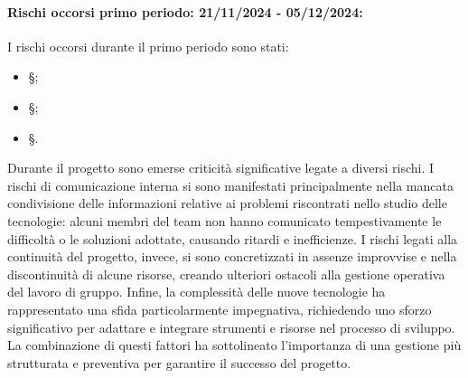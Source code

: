 \paragraph{Rischi occorsi primo periodo: 21/11/2024 - 05/12/2024: }
I rischi occorsi durante il primo periodo sono stati:
\begin{itemize}
    \item \S{};
    \item \S{};
    \item \S{}.
\end{itemize}Durante il progetto sono emerse criticità significative legate a diversi rischi. I rischi di comunicazione interna si sono manifestati principalmente nella mancata condivisione delle informazioni relative ai problemi riscontrati nello studio delle tecnologie: alcuni membri del team non hanno comunicato tempestivamente le difficoltà o le soluzioni adottate, causando ritardi e inefficienze.
I rischi legati alla continuità del progetto, invece, si sono concretizzati in assenze improvvise e nella discontinuità di alcune risorse, creando ulteriori ostacoli alla gestione operativa del lavoro di gruppo.
Infine, la complessità delle nuove tecnologie ha rappresentato una sfida particolarmente impegnativa, richiedendo uno sforzo significativo per adattare e integrare strumenti e risorse nel processo di sviluppo. La combinazione di questi fattori ha sottolineato l'importanza di una gestione più strutturata e preventiva per garantire il successo del progetto.

